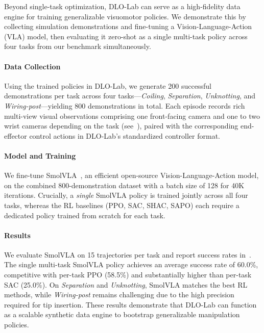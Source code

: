 Beyond single-task optimization, DLO-Lab can serve as a high-fidelity data engine for training generalizable visuomotor policies. We demonstrate this by collecting simulation demonstrations and fine-tuning a Vision-Language-Action (VLA) model, then evaluating it zero-shot as a single multi-task policy across four tasks from our benchmark simultaneously.

\paragraph{Data Collection}
Using the trained policies in DLO-Lab, we generate 200 successful demonstrations per task across four tasks---\textit{Coiling}, \textit{Separation}, \textit{Unknotting}, and \textit{Wiring-post}---yielding 800 demonstrations in total. Each episode records rich multi-view visual observations comprising one front-facing camera and one to two wrist cameras depending on the task (see~), paired with the corresponding end-effector control actions in DLO-Lab's standardized controller format.

\paragraph{Model and Training}
We fine-tune SmolVLA~\cite{shukor2025smolvla}, an efficient open-source Vision-Language-Action model, on the combined 800-demonstration dataset with a batch size of 128 for 40K iterations. Crucially, a \emph{single} SmolVLA policy is trained jointly across all four tasks, whereas the RL baselines (PPO, SAC, SHAC, SAPO) each require a dedicated policy trained from scratch for each task.

\paragraph{Results}
We evaluate SmolVLA on 15 trajectories per task and report success rates in~. The single multi-task SmolVLA policy achieves an average success rate of 60.0\%, competitive with per-task PPO (58.5\%) and substantially higher than per-task SAC (25.0\%). On \textit{Separation} and \textit{Unknotting}, SmolVLA matches the best RL methods, while \textit{Wiring-post} remains challenging due to the high precision required for tip insertion. These results demonstrate that DLO-Lab can function as a scalable synthetic data engine to bootstrap generalizable manipulation policies.

